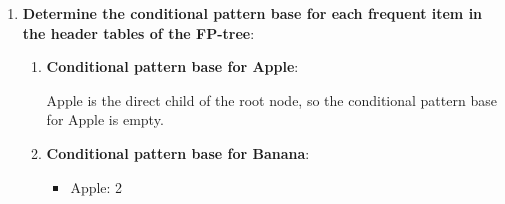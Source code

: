 \documentclass[
english,
smallborders
]{i6prcsht}
\begin{document}
\begin{solution}
\begin{enumerate}
\begin{enumerate}
\begin{center}
{
				            }
			            \end{center}
			            
		      \end{enumerate}
		      
		\item \textbf{Determine the conditional pattern base for each frequent item in the header tables of the FP-tree}:
		      
		      
		      \begin{enumerate}	
			      \item \textbf{Conditional pattern base for Apple}:
			            
			            Apple is the direct child of the root node, so the conditional pattern base for Apple is empty.
			            
			      \item \textbf{Conditional pattern base for Banana}:
			            
			            \begin{itemize}	
				            \item Apple: 2
			            \end{itemize}
			            

\end{enumerate}
\end{enumerate}
\end{solution}
\end{document}
